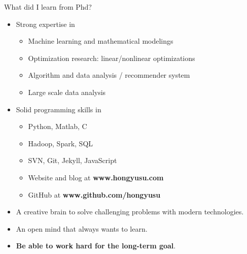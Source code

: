 \documentclass[first=dgreen,second=purple,logo=yellowexc]{aaltoslides}
\begin{document}
\begin{frame}{What did I learn from Phd?}
	\begin{itemize}
		\item Strong expertise in
		\begin{itemize}\footnotesize
			\item Machine learning and mathematical modelings
			\item Optimization research: linear/nonlinear optimizations
			\item Algorithm and data analysis / recommender system
			\item Large scale data analysis
		\end{itemize}
		\item Solid programming skills in
		\begin{itemize}\footnotesize
			\item Python, Matlab, C
			\item Hadoop, Spark, SQL
			\item SVN, Git, Jekyll, JavaScript
			\item Website and blog at {\bf www.hongyusu.com}
			\item GitHub at {\bf www.github.com/hongyusu}
		\end{itemize}
		\item A creative brain to solve challenging problems with modern technologies.
		\item An open mind that always wants to learn.
		\item {\bf Be able to work hard for the long-term goal}.
	\end{itemize}
\end{frame}
\end{document}

